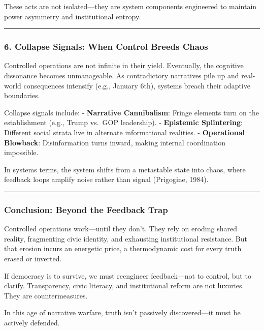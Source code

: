 These acts are not isolated---they are system components engineered to
maintain power asymmetry and institutional entropy.

\begin{center}\rule{0.5\linewidth}{0.5pt}\end{center}

\subsubsection{6. Collapse Signals: When Control Breeds
Chaos}\label{collapse-signals-when-control-breeds-chaos}

Controlled operations are not infinite in their yield. Eventually, the
cognitive dissonance becomes unmanageable. As contradictory narratives
pile up and real-world consequences intensify (e.g., January 6th),
systems breach their adaptive boundaries.

Collapse signals include: - \textbf{Narrative Cannibalism}: Fringe
elements turn on the establishment (e.g., Trump vs.~GOP leadership). -
\textbf{Epistemic Splintering}: Different social strata live in
alternate informational realities. - \textbf{Operational Blowback}:
Disinformation turns inward, making internal coordination impossible.

In systems terms, the system shifts from a metastable state into chaos,
where feedback loops amplify noise rather than signal (Prigogine, 1984).

\begin{center}\rule{0.5\linewidth}{0.5pt}\end{center}

\subsubsection{Conclusion: Beyond the Feedback
Trap}\label{conclusion-beyond-the-feedback-trap}

Controlled operations work---until they don't. They rely on eroding
shared reality, fragmenting civic identity, and exhausting institutional
resistance. But that erosion incurs an energetic price, a thermodynamic
cost for every truth erased or inverted.

If democracy is to survive, we must reengineer feedback---not to
control, but to clarify. Transparency, civic literacy, and institutional
reform are not luxuries. They are countermeasures.

In this age of narrative warfare, truth isn't passively discovered---it
must be actively defended.

